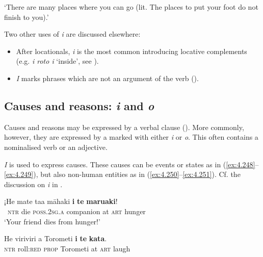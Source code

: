 \glt 
‘There are many places where you can go (lit. The places to put your foot do not finish to you).’ \textstyleExampleref{[R315.071]} 
\z

Two other uses of \textit{i} are discussed elsewhere:

\begin{itemize}
\item 
After locationals, \textit{i} is the most common  introducing locative complements (e.g. \textit{{\ꞌ}i roto i} ‘inside’, see ).

\item 
{}\textit{I} marks  phrases which are not an argument of the verb (). 

\end{itemize}

\subsection{Causes and reasons: \textit{{\ꞌ}i} and \textit{{\ꞌ}o}} \label{sec:4.7.2.2}
Causes and reasons may be expressed by a verbal clause (). More commonly, however, they are expressed by a  marked with either \textit{{\ꞌ}i} or \textit{{\ꞌ}o}. This  often contains a nominalised verb or an adjective.

\textit{{\ꞌ}I} is used to express causes. These causes can be events or states as in (\ref{ex:4.248}–\ref{ex:4.249}), but also non-human entities as in (\ref{ex:4.250}–\ref{ex:4.251}). Cf. the discussion on  \textit{i} in .

\ea\label{ex:4.248}
\gll ¡He mate ta{\ꞌ}a māhaki \textbf{{\ꞌ}i} \textbf{te} \textbf{maruaki}! \\
~\textsc{ntr} die \textsc{poss.2sg.a} companion at \textsc{art} hunger \\

\glt 
‘Your friend dies from hunger!’ \textstyleExampleref{[R245.142]} 
\z

\ea\label{ex:4.249}
\gll He viriviri a Torometi \textbf{{\ꞌ}i} \textbf{te} \textbf{kata}. \\
\textsc{ntr}\textsc{} roll:\textsc{red} \textsc{prop} Torometi at \textsc{art} laugh \\

